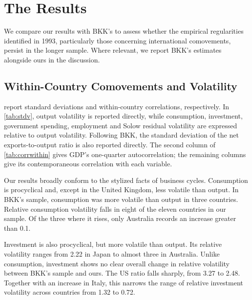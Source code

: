 \section{The Results \label{sec:theresults}}

We compare our results with BKK's to assess whether the empirical regularities identified in 1993, particularly those concerning international comovements, persist in the longer sample. Where relevant, we report BKK's estimates alongside ours in the discussion.

\subsection{Within-Country Comovements and Volatility}

 report standard deviations and within-country correlations, respectively. In \cref{tab:stdv}, output volatility is reported directly, while consumption, investment, government spending, employment and Solow residual volatility are expressed relative to output volatility. Following BKK, the standard deviation of the net exports-to-output ratio is also reported directly. The second column of \cref{tab:corrwithin} gives GDP's one-quarter autocorrelation; the remaining columns give its contemporaneous correlation with each variable.





Our results broadly conform to the stylized facts of business cycles. Consumption is procyclical and, except in the United Kingdom, less volatile than output. In BKK's sample, consumption was more volatile than output in three countries. Relative consumption volatility falls in eight of the eleven countries in our sample. Of the three where it rises, only Australia records an increase greater than 0.1.

Investment is also procyclical, but more volatile than output. Its relative volatility ranges from 2.22 in Japan to almost three in Australia. Unlike consumption, investment shows no clear overall change in relative volatility between BKK's sample and ours. The US ratio falls sharply, from 3.27 to 2.48. Together with an increase in Italy, this narrows the range of relative investment volatility across countries from 1.32 to 0.72.

